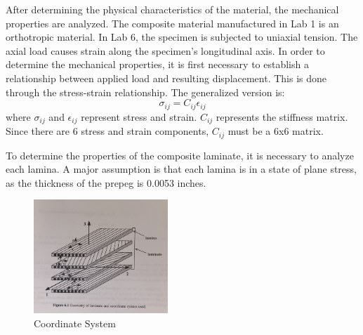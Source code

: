 After determining the physical characteristics of the material, the mechanical properties are analyzed. The composite material manufactured in Lab 1 is an orthotropic material. In Lab 6, the specimen is subjected to uniaxial tension. The axial load causes strain along the specimen's longitudinal axis. In order to determine the mechanical properties, it is first necessary to establish a relationship between applied load and resulting displacement. This is done through the stress-strain relationship. The generalized version is:
\begin{equation}
    \sigma_{ij} = C_{ij}\epsilon_{ij}
\end{equation}
where $\sigma_{ij}$ and $\epsilon_{ij}$ represent stress and strain. $C_{ij}$ represents the stiffness matrix. Since there are 6 stress and strain components, $C_{ij}$ must be a 6x6 matrix.

To determine the properties of the composite laminate, it is necessary to analyze each lamina. A major assumption is that each lamina is in a state of plane stress, as the thickness of the prepeg is 0.0053 inches. 

\begin{figure}[!h]
    \centering
    \includegraphics[width=0.45\textwidth]{Pictures/Theory and Analysis/coordsystem.jpg}
    \caption{Coordinate System\cite{labmanual}}
    \label{fig:coordsystem}
\end{figure}

